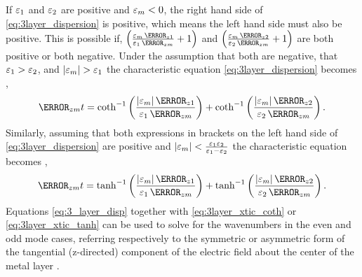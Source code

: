 If $\varepsilon_1$ and $\varepsilon_2$ are positive and $\varepsilon_m < 0$, the right hand side of \eqref{eq:3layer_dispersion} is positive, which means the left hand side must also be positive. This is possible if,
$\left( \frac{\E_m \,\A_{z1}}{\E_1 \,\A_{zm}} + 1 \right)$ and
$\left( \frac{\E_m \,\A_{z2}}{\E_2 \,\A_{zm}} + 1 \right)$ are both positive or both negative. Under the assumption that both are negative, that
$ \varepsilon_1 > \varepsilon_2 $, and $\left| \varepsilon_m \right| > \varepsilon_1$  the characteristic equation \eqref{eq:3layer_dispersion} becomes \cite{Durach_2007},
%
\begin{equation}
  \A_{zm}t = \coth ^{-1} \left( \frac{\left| \E_m \right|\A_{z1}}{\E_1 \,\A_{zm}} \right) + \coth ^{-1} \left( \frac{\left| \E_m \right|\A_{z2}}{\E_2 \,\A_{zm}} \right).
  \label{eq:3layer_xtic_coth}
\end{equation}
%
Similarly, assuming that both expressions in brackets on the left hand side of \eqref{eq:3layer_dispersion} are positive and
$\left| \varepsilon_m  \right| < \frac{\varepsilon_1 \varepsilon_2}{\varepsilon_1 - \varepsilon_2}$  the characteristic equation becomes \cite{Durach_2007},
%
\begin{equation}
  \A_{zm} t = \tanh^{-1} \left( \frac{\left| \E_m \right| \A_{z1}}{\E_1 \,\A_{zm}} \right) + \tanh^{-1} \left( \frac{\left| \E_m \right| \A_{z2}}{\E_2 \,\A_{zm}} \right).
  \label{eq:3layer_xtic_tanh}
\end{equation}
%
Equations \eqref{eq:3_layer_disp} together with \eqref{eq:3layer_xtic_coth} or \eqref{eq:3layer_xtic_tanh} can be used to solve for the wavenumbers in the even and odd mode cases, referring respectively to the symmetric or asymmetric form of the tangential (z-directed) component of the electric field about the center of the metal layer \cite{Burke1986}.

